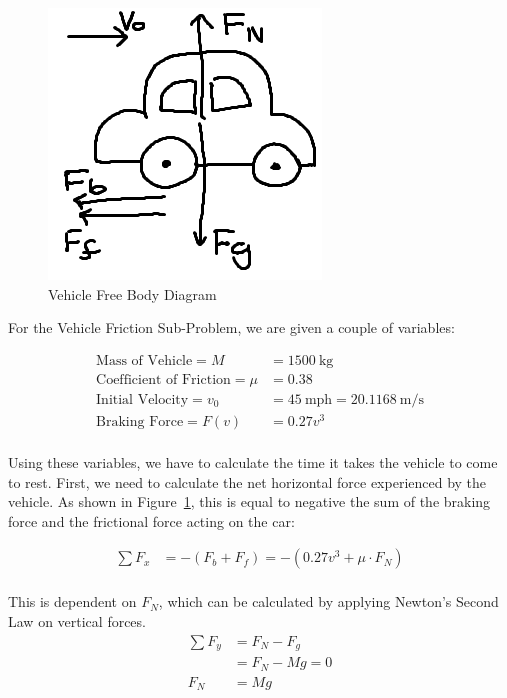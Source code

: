 \documentclass[10pt,letterpaper]{article}
\begin{document}
   	\begin{figure}[h!]
   		\centering
   		\includegraphics[scale=0.5]{CarFBD1.png}
   		\caption{Vehicle Free Body Diagram}
   		\label{fig:carfbd1}
   	\end{figure}
   	
   	For the Vehicle Friction Sub-Problem, we are given a couple of variables:
   	
   	\begin{align*}
   		\textrm{Mass of Vehicle}=M&=1500\:\textrm{kg}\\
   		\textrm{Coefficient of Friction}=\mu&=0.38\\
   		\textrm{Initial Velocity}=v_0&=45\:\textrm{mph}=20.1168\:\textrm{m/s}\\
   		\textrm{Braking Force}=F(v)&=0.27v^3\\
   	\end{align*}
   	
   	Using these variables, we have to calculate the time it takes the vehicle to come to rest. First, we need to calculate the net horizontal force experienced by the vehicle. As shown in Figure~\ref{fig:carfbd1}, this is equal to negative the sum of the braking force and the frictional force acting on the car:
   	
   	\begin{align*}
   		\sum F_x &= -(F_b+F_f)=-(0.27v^3+\mu \cdot F_N)\\
   	\end{align*}
   	
   	This is dependent on $F_N$, which can be calculated by applying Newton's Second Law on vertical forces.
   	\begin{align*}
   		\sum F_y &= F_N-F_g\\
   		&= F_N-Mg=0\\
   		F_N &= Mg
   	\end{align*}
   	
\end{document}
